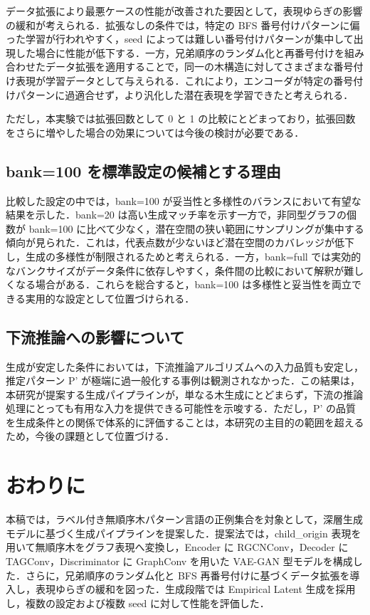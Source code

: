 \documentclass[submit,techrep,noauthor]{ipsj}
\begin{document}
データ拡張により最悪ケースの性能が改善された要因として，表現ゆらぎの影響の緩和が考えられる．拡張なしの条件では，特定の BFS 番号付けパターンに偏った学習が行われやすく，seed によっては難しい番号付けパターンが集中して出現した場合に性能が低下する．一方，兄弟順序のランダム化と再番号付けを組み合わせたデータ拡張を適用することで，同一の木構造に対してさまざまな番号付け表現が学習データとして与えられる．これにより，エンコーダが特定の番号付けパターンに過適合せず，より汎化した潜在表現を学習できたと考えられる．

ただし，本実験では拡張回数として 0 と 1 の比較にとどまっており，拡張回数をさらに増やした場合の効果については今後の検討が必要である．

\subsection{bank=100 を標準設定の候補とする理由}

比較した設定の中では，bank=100 が妥当性と多様性のバランスにおいて有望な結果を示した．bank=20 は高い生成マッチ率を示す一方で，非同型グラフの個数が bank=100 に比べて少なく，潜在空間の狭い範囲にサンプリングが集中する傾向が見られた．これは，代表点数が少ないほど潜在空間のカバレッジが低下し，生成の多様性が制限されるためと考えられる．一方，bank=full では実効的なバンクサイズがデータ条件に依存しやすく，条件間の比較において解釈が難しくなる場合がある．これらを総合すると，bank=100 は多様性と妥当性を両立できる実用的な設定として位置づけられる．

\subsection{下流推論への影響について}

生成が安定した条件においては，下流推論アルゴリズムへの入力品質も安定し，推定パターン P' が極端に過一般化する事例は観測されなかった．この結果は，本研究が提案する生成パイプラインが，単なる木生成にとどまらず，下流の推論処理にとっても有用な入力を提供できる可能性を示唆する．ただし，P' の品質を生成条件との関係で体系的に評価することは，本研究の主目的の範囲を超えるため，今後の課題として位置づける．


\section{おわりに}

本稿では，ラベル付き無順序木パターン言語の正例集合を対象として，深層生成モデルに基づく生成パイプラインを提案した．提案法では，child\_origin 表現を用いて無順序木をグラフ表現へ変換し，Encoder に RGCNConv，Decoder に TAGConv，Discriminator に GraphConv を用いた VAE-GAN 型モデルを構成した．さらに，兄弟順序のランダム化と BFS 再番号付けに基づくデータ拡張を導入し，表現ゆらぎの緩和を図った．生成段階では Empirical Latent 生成を採用し，複数の設定および複数 seed に対して性能を評価した．
\end{document}
